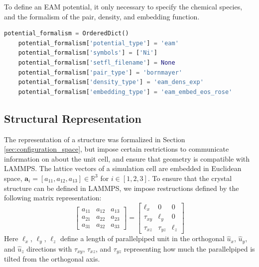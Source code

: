 To define an EAM potential, it only necessary to specify the chemical species, and the formalism of the pair, density, and embedding function.
\begin{lstlisting}[language=Python]
	potential_formalism = OrderedDict()
	potential_formalism['potential_type'] = 'eam'
	potential_formalism['symbols'] = ['Ni']
	potential_formalism['setfl_filename'] = None
	potential_formalism['pair_type'] = 'bornmayer'
	potential_formalism['density_type'] = 'eam_dens_exp'
	potential_formalism['embedding_type'] = 'eam_embed_eos_rose'
\end{lstlisting}

\subsection{Structural Representation}
\label{sec:pypospack_structures}

The representation of a structure was formalized in Section \ref{sec:configuration_space}, but impose certain restrictions to communicate information on about the unit cell, and ensure that geometry is compatible with LAMMPS.
The lattice vectors of a simulation cell are embedded in Euclidean space,  $\bm{a}_i = [a_{11}, a_{12}, a_{13}] \in \mathbb{R}^3$ for $i \in [1,2,3]$.  To ensure that the crystal structure can be defined in LAMMPS, we impose restructions defined by the following matrix representation:
\begin{equation}
	\begin{bmatrix}
		a_{11} & a_{12} & a_{13} \\
		a_{21} & a_{22} & a_{23} \\
		a_{31} & a_{32} & a_{33}
	\end{bmatrix}
	=
	\begin{bmatrix}
		\ell_x    & 0         & 0     \\
		\tau_{xy} & \ell_y    & 0     \\
		\tau_{xz} & \tau_{yz} & \ell_z
	\end{bmatrix}
\end{equation}
Here $\ell_x$, $\ell_y$, $\ell_z$ define a length of parallelpiped unit in the orthogonal $\hat{u}_x$, $\hat{u}_y$, and $\hat{u}_z$ directions with $\tau_{xy}$, $\tau_{xz}$, and $\tau_{yz}$ representing how much the parallelpiped is tilted from the orthogonal axis.


